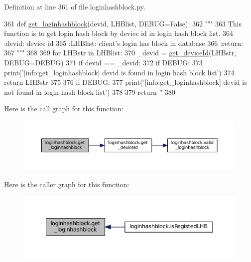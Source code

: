 Definition at line 361 of file loginhashblock.\+py.


\begin{DoxyCode}
361 \textcolor{keyword}{def }\hyperlink{namespaceloginhashblock_a6187961cb9009c7836e7e6e639085f93}{get\_loginhashblock}(devid, LHBlist, DEBUG=False):
362     \textcolor{stringliteral}{"""}
363 \textcolor{stringliteral}{    This function is to get login hash block by device id in login hash block list.}
364 \textcolor{stringliteral}{    :devid: device id}
365 \textcolor{stringliteral}{    :LHBlist: client's login has block in database}
366 \textcolor{stringliteral}{    :return:}
367 \textcolor{stringliteral}{    """}
368 
369     \textcolor{keywordflow}{for} LHBstr \textcolor{keywordflow}{in} LHBlist:
370         \_devid = \hyperlink{namespaceloginhashblock_a17417f2f6bca76ab51170082a562e5f6}{get\_deviceId}(LHBstr, DEBUG=DEBUG)
371         \textcolor{keywordflow}{if} devid == \_devid:
372             \textcolor{keywordflow}{if} DEBUG:
373                 print(\textcolor{stringliteral}{'[info:get\_loginhashblock] devid is found in login hash block list'})
374             \textcolor{keywordflow}{return} LHBstr
375 
376     \textcolor{keywordflow}{if} DEBUG:
377         print(\textcolor{stringliteral}{'[info:get\_loginhashblock] devid is not found in login hash block list'})
378 
379     \textcolor{keywordflow}{return} \textcolor{stringliteral}{''}
380 
\end{DoxyCode}


Here is the call graph for this function\+:\nopagebreak
\begin{figure}[H]
\begin{center}
\leavevmode
\includegraphics[width=350pt]{namespaceloginhashblock_a6187961cb9009c7836e7e6e639085f93_cgraph}
\end{center}
\end{figure}




Here is the caller graph for this function\+:\nopagebreak
\begin{figure}[H]
\begin{center}
\leavevmode
\includegraphics[width=350pt]{namespaceloginhashblock_a6187961cb9009c7836e7e6e639085f93_icgraph}
\end{center}
\end{figure}


